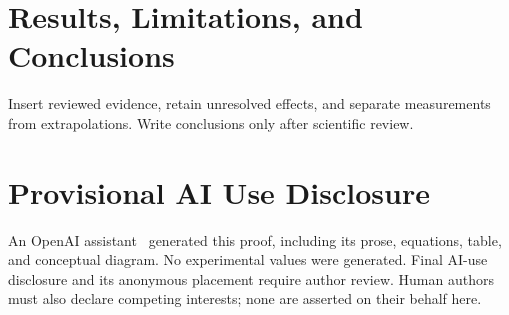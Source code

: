 \documentclass{llncs}
\begin{document}
\section{Results, Limitations, and Conclusions}
Insert reviewed evidence, retain unresolved effects, and separate measurements
from extrapolations. Write conclusions only after scientific review.

\section*{Provisional AI Use Disclosure}
An OpenAI assistant~\cite{openai2026} generated this proof, including its
prose, equations, table, and conceptual diagram. No experimental values were
generated. Final AI-use disclosure and its anonymous placement require author
review. Human authors must also declare competing interests; none are
asserted on their behalf here.



\end{document}
